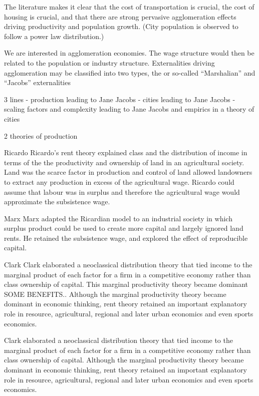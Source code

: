 The literature makes it clear that the cost of transportation is crucial, the cost of housing is crucial, and that there are strong pervasive agglomeration effects driving productivity and population growth. (City population is observed to follow a power law distribution.)

We are interested in agglomeration economies. The wage  structure would then be related to the population or industry  structure. Externalities driving agglomeration may be classified  into two types, the  or so-called ``Marshalian''  and ``Jacobs'' externalities


3 lines  
- production leading to Jane Jacobs
- cities leading to Jane Jacobs
- scaling factors and complexity leading to Jane Jacobs and empirics in a theory of cities

2 theories of production

Ricardo
Ricardo’s rent theory explained class and the distribution of income in terms of the the productivity and ownership of land in an agricultural society. Land was the scarce factor in production and control of land allowed landowners to extract any production in excess of the agricultural wage. Ricardo could assume that labour was in surplus and therefore the agricultural wage would approximate the subsistence wage. 

Marx
Marx adapted the Ricardian model to an industrial society in which surplus product could be used to create more capital and largely ignored land rents. He retained the subsistence wage, and explored the effect of reproducible capital.

Clark
Clark %
elaborated a neoclassical distribution theory that tied income to the marginal product of each factor for a firm in a competitive economy rather than class ownership of capital. 
This marginal productivity theory became dominant SOME BENEFITS.. Although the marginal productivity theory became dominant in economic thinking, rent theory retained an important explanatory role in resource, agricultural, regional and later urban economics and even sports economics. 

Clark %
elaborated a neoclassical distribution theory that tied income to the marginal product of each factor for a firm in a competitive economy rather than class ownership of capital. Although the marginal productivity theory became dominant in economic thinking, rent theory retained an important explanatory role in resource, agricultural, regional and later urban economics and even sports economics. 

